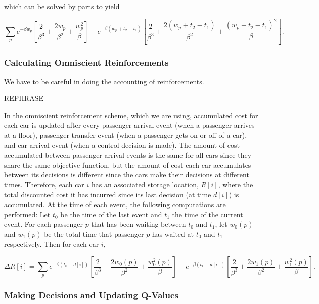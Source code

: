 which can be solved by parts to yield

\begin{equation}
    \sum_p e^{-\beta w_p} \left[\frac{2}{\beta^3} + \frac{2w_p}{\beta^2} + \frac{w_p^2}{\beta}  \right] - e^{-\beta(w_p + t_2 - t_1)} \left[ \frac{2}{\beta^3} + \frac{2(w_p + t_2 - t_1)}{\beta^2} + \frac{(w_p + t_2 - t_1)^2}{\beta} \right]. \label{eq:cost_reinforcement_sum}
\end{equation}

\subsubsection{Calculating Omniscient Reinforcements}

We have to be careful in doing the accounting of reinforcements.


{\color{red} REPHRASE}

In the omniscient reinforcement scheme, which we are using, accumulated cost for each car is updated after every passenger arrival event (when a passenger arrives at a floor), passenger transfer event (when a passenger gets on or off of a car), and car arrival event (when a control decision is made). The amount of cost accumulated between passenger arrival events is the same for all cars since they share the same objective function, but the amount of cost each car accumulates between its decisions is different since the cars make their decisions at different times. Therefore, each car $i$ has an associated storage location, $R[i]$, where the total discounted cost it has incurred since its last decision (at time $d[i]$) is accumulated. At the time of each event, the following computations are performed: Let $t_0$ be the time of the last event and $t_1$ the time of the current event. For each passenger $p$ that has been waiting between $t_0$ and $t_1$, let $w_0 (p)$ and $w_1(p)$ be the total time that passenger $p$ has waited at $t_0$ and $t_1$ respectively. Then for each car $i$,

\begin{equation}
   \Delta R[i] = \sum_p e^{-\beta (t_0 - d[i])} \left[\frac{2}{\beta^3} + \frac{2w_0(p)}{\beta^2} + \frac{w_0^2(p)}{\beta}  \right] - e^{-\beta(t_1 - d[i])} \left[ \frac{2}{\beta^3} + \frac{2w_1(p)}{\beta^2} + \frac{w_1^2(p)}{\beta} \right]. \label{eq:cost_reinforcement_partial}
\end{equation}

\subsubsection{Making Decisions and Updating Q-Values}

